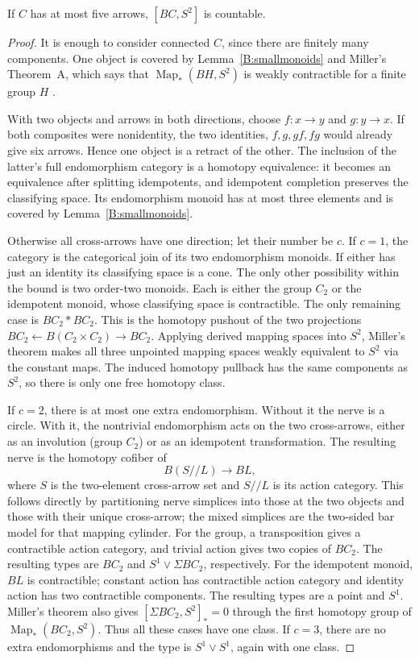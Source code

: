 \begin{lemma}
\label{B:smallcategories}
If $C$ has at most five arrows, $[BC,S^2]$ is countable.
\end{lemma}
\begin{proof}
It is enough to consider connected $C$, since there are finitely
many components. One object is covered by Lemma~\ref{B:smallmonoids} and Miller's
Theorem~A, which says that $\operatorname{Map}_*(BH,S^2)$ is weakly
contractible for a finite group $H$
\cite[Theorem~A, p.~39]{Miller1984,Miller1985Correction}.

With two objects and arrows in both directions, choose $f:x\to y$
and $g:y\to x$. If both composites were nonidentity, the two
identities, $f,g,gf,fg$ would already give six arrows. Hence one
object is a retract of the other. The inclusion of the latter's full
endomorphism category is a homotopy equivalence: it becomes an
equivalence after splitting idempotents, and idempotent completion
preserves the classifying space. Its endomorphism monoid has at most
three elements and is covered by Lemma~\ref{B:smallmonoids}.

Otherwise all cross-arrows have one direction; let their number be $c$.
If $c=1$, the category is the categorical join of its two endomorphism
monoids. If either has just an identity its classifying space is a cone.
The only other possibility within the bound is two order-two monoids.
Each is either the group $C_2$ or the idempotent monoid, whose
classifying space is contractible. The only remaining case is
$BC_2*BC_2$. This is the homotopy pushout of the two projections
$BC_2\leftarrow B(C_2\times C_2)\to BC_2$. Applying derived mapping
spaces into $S^2$, Miller's theorem makes all three unpointed mapping
spaces weakly equivalent to $S^2$ via the constant maps. The induced
homotopy pullback has the same components as $S^2$, so there is only
one free homotopy class.

If $c=2$, there is at most one extra endomorphism. Without it the
nerve is a circle. With it, the nontrivial endomorphism acts on the
two cross-arrows, either as an involution (group $C_2$) or as an
idempotent transformation. The resulting nerve is the homotopy
cofiber of
\[
 B(S\mathbin{/\!/}L)\longrightarrow BL,
\]
where $S$ is the two-element cross-arrow set and
$S\mathbin{/\!/}L$ is its action category. This follows directly
by partitioning nerve simplices into those at the two objects and
those with their unique cross-arrow; the mixed simplices are the
two-sided bar model for that mapping cylinder.
For the group, a transposition gives a contractible action category,
and trivial action gives two copies of $BC_2$. The resulting types
are $BC_2$ and $S^1\vee\Sigma BC_2$, respectively. For the
idempotent monoid, $BL$ is contractible; constant action has
contractible action category and identity action has two contractible
components. The resulting types are a point and $S^1$.
Miller's theorem also gives $[\Sigma BC_2,S^2]_*=0$ through the
first homotopy group of $\operatorname{Map}_*(BC_2,S^2)$.
Thus all these cases have one class. If $c=3$, there are no extra
endomorphisms and the type is $S^1\vee S^1$, again with one class.


\end{proof}
